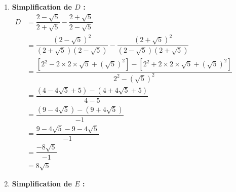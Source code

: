 \documentclass[12pt,a4paper]{article}
\begin{document}
\begin{enumerate}
    \item \textbf{Simplification de $D$ :} \\
    $
    \begin{aligned}
    D &= \dfrac{2 - \sqrt{5}}{2 + \sqrt{5}} - \dfrac{2 + \sqrt{5}}{2 - \sqrt{5}} \\[0.2cm]
    &= \dfrac{(2 - \sqrt{5})^2}{(2 + \sqrt{5})(2 - \sqrt{5})} - \dfrac{(2 + \sqrt{5})^2}{(2 - \sqrt{5})(2 + \sqrt{5})} \\[0.2cm]
    &= \dfrac{\left[2^2 - 2 \times 2 \times \sqrt{5} + (\sqrt{5})^2\right] - \left[2^2 + 2 \times 2 \times \sqrt{5} + (\sqrt{5})^2\right]}{2^2 - (\sqrt{5})^2} \\[0.2cm]
    &= \dfrac{(4 - 4\sqrt{5} + 5) - (4 + 4\sqrt{5} + 5)}{4 - 5} \\[0.2cm]
    &= \dfrac{(9 - 4\sqrt{5}) - (9 + 4\sqrt{5})}{-1} \\[0.2cm]
    &= \dfrac{9 - 4\sqrt{5} - 9 - 4\sqrt{5}}{-1} \\[0.2cm]
    &= \dfrac{-8\sqrt{5}}{-1} \\[0.2cm]
    &= 8\sqrt{5}
    \end{aligned}
    $

    \item \textbf{Simplification de $E$ :} \\

\end{enumerate}
\end{document}
